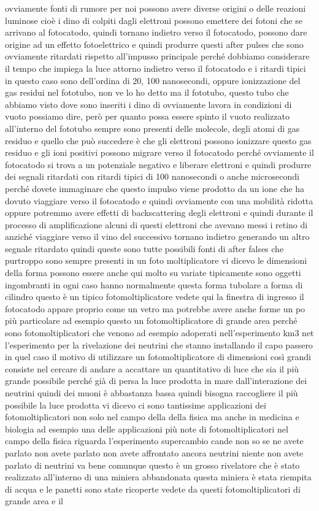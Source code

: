 ovviamente fonti di rumore per noi possono avere diverse origini o delle reazioni luminose cioè i dino di colpiti dagli elettroni possono emettere dei fotoni che se arrivano al fotocatodo, quindi tornano indietro verso il fotocatodo, possono dare origine ad un effetto fotoelettrico e quindi produrre questi after pulses che sono ovviamente ritardati rispetto all'impusso principale perché dobbiamo considerare il tempo che impiega la luce attorno indietro verso il fotocatodo e i ritardi tipici in questo caso sono dell'ordina di 20, 100 nanosecondi, oppure ionizzazione del gas residui nel fototubo, non ve lo ho detto ma il fototubo, questo tubo che abbiamo visto dove sono inseriti i dino di ovviamente lavora in condizioni di vuoto possiamo dire, però per quanto possa essere spinto il vuoto realizzato all'interno del fototubo sempre sono presenti delle molecole, degli atomi di gas residuo e quello che può succedere è che gli elettroni possono ionizzare questo gas residuo e gli ioni positivi possono migrare verso il fotocatodo perché ovviamente il fotocatodo si trova a un potenziale negativo e liberare elettroni e quindi produrre dei segnali ritardati con ritardi tipici di 100 nanosecondi o anche microsecondi perché dovete immaginare che questo impulso viene prodotto da un ione che ha dovuto viaggiare verso il fotocatodo e quindi ovviamente con una mobilità ridotta oppure potremmo avere effetti di backscattering degli elettroni e quindi durante il processo di amplificazione alcuni di questi elettroni che avevano messi i retino di anziché viaggiare verso il vino del successivo tornano indietro generando un altro segnale ritardato quindi queste sono tutte possibili fonti di after falses che purtroppo sono sempre presenti in un foto moltiplicatore vi dicevo le dimensioni della forma possono essere anche qui molto su variate tipicamente sono oggetti ingombranti in ogni caso hanno normalmente questa forma tubolare a forma di cilindro questo è un tipico fotomoltiplicatore vedete qui la finestra di ingresso il fotocatodo appare proprio come un vetro ma potrebbe avere anche forme un po più particolare ad esempio questo un fotomoltiplicatore di grande area perché sono fotomoltiplicatori che venono ad esempio adoperati nell'esperimento km3 net l'esperimento per la rivelazione dei neutrini che stanno installando il capo passero in quel caso il motivo di utilizzare un fotomoltiplicatore di dimensioni così grandi consiste nel cercare di andare a accattare un quantitativo di luce che sia il più grande possibile perché già di persa la luce prodotta in mare dall'interazione dei neutrini quindi dei muoni è abbastanza bassa quindi bisogna raccogliere il più possibile la luce prodotta vi dicevo ci sono tantissime applicazioni dei fotomoltiplicatori non solo nel campo della della fisica ma anche in medicina e biologia ad esempio una delle applicazioni più note di fotomoltiplicatori nel campo della fisica riguarda l'esperimento supercambio cande non so se ne avete parlato non avete parlato non avete affrontato ancora neutrini niente non avete parlato di neutrini va bene comunque questo è un grosso rivelatore che è stato realizzato all'interno di una miniera abbandonata questa miniera è stata riempita di acqua e le panetti sono state ricoperte vedete da questi fotomoltiplicatori di grande area e il 